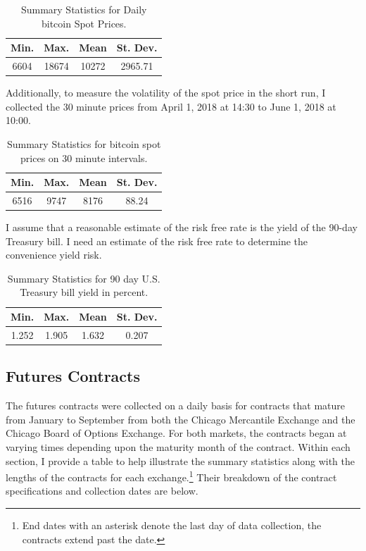 \documentclass{paper}
\begin{document}
\begin{doublespacing}
\begin{table}[H]
\centering
\begin{tabular}{|c | c | c | c |}\hline
Min. & Max. & Mean & St. Dev. \\\hline
6604 & 18674 & 10272 & 2965.71\\\hline
\end{tabular}
\caption{Summary Statistics for Daily bitcoin Spot Prices.}\label{dspot}
\end{table}

Additionally, to measure the volatility of the spot price in the short run, I 
collected the 30 minute prices from April 1, 2018 at 14:30 to June 1, 2018 at 10:00.
\begin{table}[H]
\centering
\begin{tabular}{|c | c | c | c |}\hline
Min. & Max. & Mean & St. Dev. \\\hline
6516 & 9747 & 8176 & 88.24\\\hline
\end{tabular}
\caption{Summary Statistics for bitcoin spot prices on 30 minute intervals.}\label{30spot}
\end{table}
I assume that a reasonable estimate of the risk free rate is the yield of the 90-day Treasury bill. I need an estimate of the risk free rate to determine the convenience yield risk.
\begin{table}[H]
\centering
\begin{tabular}{|c | c | c | c |}\hline
Min. & Max. & Mean & St. Dev. \\\hline
1.252 & 1.905 & 1.632 & 0.207\\\hline
\end{tabular}
\caption{Summary Statistics for 90 day U.S. Treasury bill yield in percent.}\label{yield}
\end{table}
\subsection{Futures Contracts}
The futures contracts were collected on a daily basis for contracts that mature from January to September from both the Chicago Mercantile Exchange and the Chicago Board of Options Exchange. For both markets, the contracts began at varying times depending upon the maturity month of the contract. Within each section, I provide a table to help illustrate the summary statistics along with the lengths of the contracts for each exchange.\footnote{End dates with an asterisk denote the last day of data collection, the contracts extend past the date.} Their breakdown of the contract specifications and collection dates are below. 


\end{doublespacing}
\end{document}
